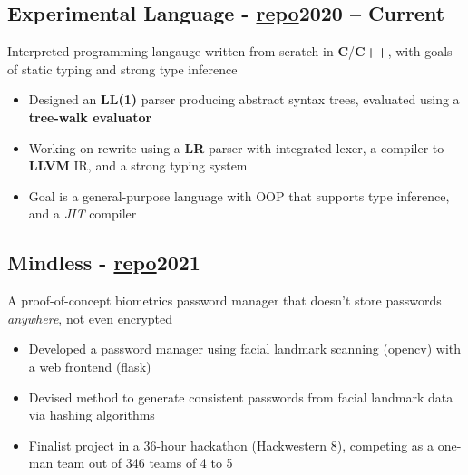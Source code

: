 \documentclass[9pt]{article}
\begin{document}
\subsection{Experimental Language \normalsize\textnormal{- \href{https://github.com/ianayl/ex-interpreter}{repo}}\hfill \normalsize\textnormal{2020 -- Current}}
Interpreted programming langauge written from scratch in \textbf{C}/\textbf{C++}, with goals of static typing and strong type inference
\vspace{-0.5em}
\begin{itemize}
  \item Designed an \textbf{LL(1)} parser producing abstract syntax trees, evaluated using a \textbf{tree-walk evaluator}
  \item Working on rewrite using a \textbf{LR} parser with integrated lexer, a compiler to \textbf{LLVM} IR, and a strong typing system
    \item Goal is a general-purpose language with OOP that supports type inference, and a \textit{JIT} compiler 
\end{itemize}

\subsection{Mindless \normalsize\textnormal{- \href{https://github.com/ianayl/mindless}{repo}}\hfill \normalsize\textnormal{2021}}
    A proof-of-concept biometrics password manager that doesn't store passwords \textit{anywhere}, not even encrypted
\vspace{-0.5em}
\begin{itemize}
    \item Developed a password manager using facial landmark scanning (opencv) with a web frontend (flask)
    \item Devised method to generate consistent passwords from facial landmark data via hashing algorithms
    \item Finalist project in a 36-hour hackathon (Hackwestern 8), competing as a one-man team out of 346 teams of 4 to 5
\end{itemize}
\end{document}
